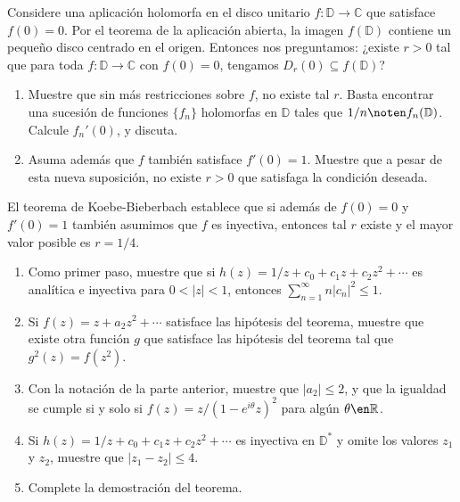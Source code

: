 \setcounter{pro}{0}
\begin{prob}
Considere una aplicación holomorfa en el disco unitario $f\colon \mathbb{D} \to \mathbb{C}$ que satisface $f(0) = 0$. Por el teorema de la aplicación abierta, la imagen $f(\mathbb{D})$ contiene un pequeño disco centrado en el origen. Entonces nos preguntamos: ¿existe $r > 0$ tal que para toda $f\colon \mathbb{D} \to \mathbb{C}$ con $f(0) = 0$, tengamos ${D}_r(0) \subseteq f(\mathbb{D})$?
\begin{enumerate}[label=(\alph*), leftmargin=1.5em]
    \item Muestre que sin más restricciones sobre $f$, no existe tal $r$. Basta encontrar una sucesión de funciones $\{f_n\}$ holomorfas en $\mathbb{D}$ tales que $1/n \noten f_n(\mathbb{D})$. Calcule $f_n'(0)$, y discuta.
    
    \item Asuma además que $f$ también satisface $f'(0) = 1$. Muestre que a pesar de esta nueva suposición, no existe $r > 0$ que satisfaga la condición deseada.
    \end{enumerate}
    
    El teorema de Koebe-Bieberbach establece que si además de $f(0) = 0$ y $f'(0) = 1$ también asumimos que $f$ es inyectiva, entonces tal $r$ existe y el mayor valor posible es $r = 1/4$.

    \begin{enumerate}[label=(\alph*), leftmargin=1.5em, resume]
    \item Como primer paso, muestre que si $h(z) = 1/z + c_0 + c_1 z + c_2 z^2 + \cdots$ es analítica e inyectiva para $0 < |z| < 1$, entonces $\sum_{n=1}^\infty n|c_n|^2 \le 1$.
    
    \item Si $f(z) = z + a_2 z^2 + \cdots$ satisface las hipótesis del teorema, muestre que existe otra función $g$ que satisface las hipótesis del teorema tal que $g^2(z) = f(z^2)$. 
    
    \item Con la notación de la parte anterior, muestre que $|a_2| \le 2$, y que la igualdad se cumple si y solo si $f(z) = z/(1 - e^{i\theta}z)^2$ para algún $\theta \en \mathbb{R}$.
    
    \item Si $h(z) = 1/z + c_0 + c_1 z + c_2 z^2 + \cdots$ es inyectiva en $\mathbb{D}^*$ y omite los valores $z_1$ y $z_2$, muestre que $|z_1 - z_2| \le 4$.
    
    \item Complete la demostración del teorema.
\end{enumerate}
\end{prob}
